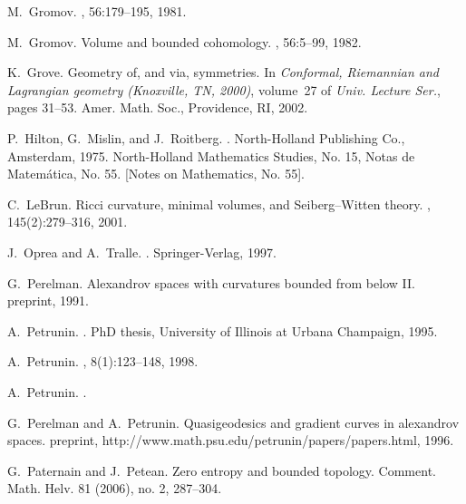 \documentclass{amsart}
\begin{document}
\begin{thebibliography}{HMR75}
M.~Gromov.
, 56:179--195, 1981.

M.~Gromov.
\newblock Volume and bounded cohomology.
, 56:5--99, 1982.


K.~Grove.
\newblock Geometry of, and via, symmetries.
\newblock In {\em Conformal, Riemannian and Lagrangian geometry (Knoxville, TN,
  2000)}, volume~27 of {\em Univ. Lecture Ser.}, pages 31--53. Amer. Math.
  Soc., Providence, RI, 2002.


P.~Hilton, G.~Mislin, and J.~Roitberg.
.
\newblock North-Holland Publishing Co., Amsterdam, 1975.
\newblock North-Holland Mathematics Studies, No. 15, Notas de Matem\'atica, No.
  55. [Notes on Mathematics, No. 55].

C.~LeBrun.
\newblock Ricci curvature, minimal volumes, and {S}eiberg--{W}itten theory.
, 145(2):279--316, 2001.

J.~Oprea and A.~Tralle.
.
\newblock Springer-Verlag, 1997.

G.~Perelman.
\newblock Alexandrov spaces with curvatures bounded from below \rm{II}.
\newblock preprint, 1991.

A.~Petrunin.
.
\newblock PhD thesis, University of Illinois at Urbana Champaign, 1995.

A.~Petrunin.
, 8(1):123--148, 1998.

A.~Petrunin.
.


G.~Perelman and A.~Petrunin.
\newblock Quasigeodesics and gradient curves in alexandrov spaces.
\newblock preprint, http://www.math.psu.edu/petrunin/papers/papers.html, 1996.

G.~Paternain and J.~Petean.
\newblock Zero entropy and bounded topology.
\newblock  Comment. Math. Helv.  81  (2006),  no. 2, 287--304.


\end{thebibliography}
\end{document}
